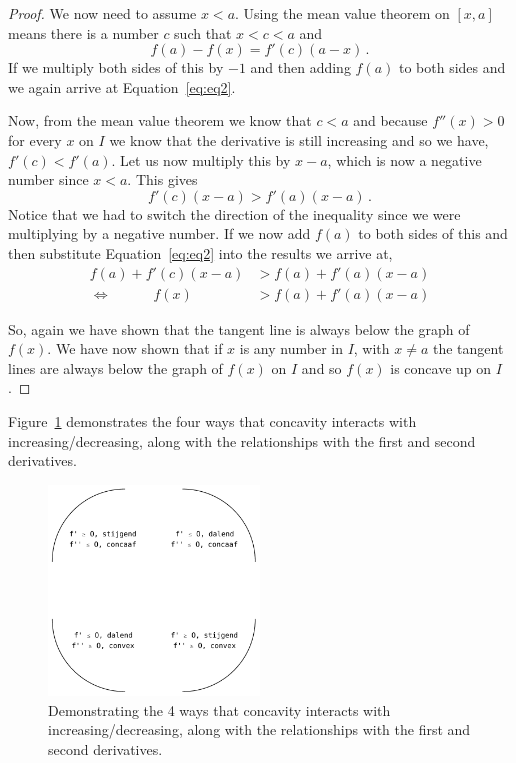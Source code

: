 \begin{proof}
We now need to assume $x<a$. Using the mean value theorem on $[x,a]$ means there is a number $c$ such that $x<c<a$ and
$$
f\left( a \right) - f\left( x \right) = f'\left( c \right)\left( {a - x} \right)\,.
$$
If we multiply both sides of this by $-1$ and then adding $f(a)$ to both sides and we again arrive at Equation~\eqref{eq:eq2}.

Now, from the mean value theorem we know that $c<a$
and because $f''(x)>0$ for every $x$ on $I$ we know that the derivative is still increasing and so we have, $f'(c)<f'(a)$. Let us now multiply this by $x-a$, which is now a negative number since $x<a$. This gives
$$
f'\left( c \right)\left( {x - a} \right) > f'\left( a \right)\left( {x - a} \right)\,.
$$
Notice that we had to switch the direction of the inequality since we were multiplying by a negative number. If we now add $f(a)$ to both sides of this and then substitute Equation~\eqref{eq:eq2} into the results we arrive at,
\begin{align*}
f\left( a \right) + f'\left( c \right)\left( {x - a} \right) & > f\left( a \right) + f'\left( a \right)\left( {x - a} \right)\\ 
 \Leftrightarrow \qquad  \quad f\left( x \right) &> f\left( a \right) + f'\left( a \right)\left( {x - a} \right)
\end{align*}

So, again we have shown that the tangent line is always below the graph of $f(x)$. We have now shown that if $x$ is any number in $I$, with $x\neq a$ the tangent lines are always below the graph of $f(x)$ on $I$ and so $f(x)$ is concave up on $I$.

\phantom{}
\end{proof}

\fi

Figure~\ref{fig_behaviour_17} demonstrates the four ways that concavity interacts with increasing/decreasing, along with the relationships with the first and second derivatives.

\begin{figure}[h]
	\begin{center}
			\includegraphics[width=0.5\textwidth]{fig_behaviour_17}
	\caption{Demonstrating the 4 ways that concavity interacts with increasing/decreasing, along with the relationships with the first and second derivatives.}
	\label{fig_behaviour_17}
	\end{center}
\end{figure}


